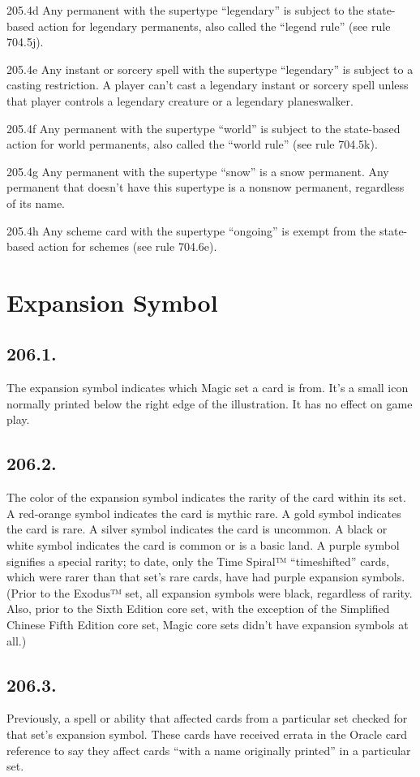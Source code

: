 205.4d Any permanent with the supertype “legendary” is subject to the state-based action for legendary permanents, also called the “legend rule” (see rule 704.5j).

205.4e Any instant or sorcery spell with the supertype “legendary” is subject to a casting restriction. A player can’t cast a legendary instant or sorcery spell unless that player controls a legendary creature or a legendary planeswalker.

205.4f Any permanent with the supertype “world” is subject to the state-based action for world permanents, also called the “world rule” (see rule 704.5k).

205.4g Any permanent with the supertype “snow” is a snow permanent. Any permanent that doesn’t have this supertype is a nonsnow permanent, regardless of its name.

205.4h Any scheme card with the supertype “ongoing” is exempt from the state-based action for schemes (see rule 704.6e).

\section{Expansion Symbol}
\subsection*{206.1.}
The expansion symbol indicates which Magic set a card is from. It’s a small icon normally printed below the right edge of the illustration. It has no effect on game play.

\subsection*{206.2.}
The color of the expansion symbol indicates the rarity of the card within its set. A red-orange symbol indicates the card is mythic rare. A gold symbol indicates the card is rare. A silver symbol indicates the card is uncommon. A black or white symbol indicates the card is common or is a basic land. A purple symbol signifies a special rarity; to date, only the Time Spiral™ “timeshifted” cards, which were rarer than that set’s rare cards, have had purple expansion symbols. (Prior to the Exodus™ set, all expansion symbols were black, regardless of rarity. Also, prior to the Sixth Edition core set, with the exception of the Simplified Chinese Fifth Edition core set, Magic core sets didn’t have expansion symbols at all.)

\subsection*{206.3.}
Previously, a spell or ability that affected cards from a particular set checked for that set’s expansion symbol. These cards have received errata in the Oracle card reference to say they affect cards “with a name originally printed” in a particular set.

